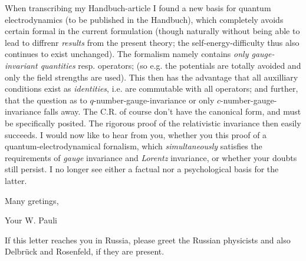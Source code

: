 \documentclass{article}
\begin{document}
When transcribing my Handbuch-article I found a new basis for quantum electrodynamics (to be published in the Handbuch), which completely avoids certain formal  in the current formulation (though naturally without being able to lead to diffrenr \textit{results} from the present theory; the self-energy-difficulty thus also continues to exist unchanged). The formalism namely contains \textit{only gauge-invariant quantities} resp. operators; (so e.g. the potentials are totally avoided and only the field strengths are used). This then has the advantage that all auxilliary conditions exist as \textit{identities}, i.e. are commutable with all operators; and further, that the question as to $q$-number-gauge-invariance or only $c$-number-gauge-invariance falls away. The C.R. of course don't have the canonical form, and must be specifically posited. The rigorous proof of the relativistic invariance then easily succeeds. I would now like to hear from you, whether you  this proof of a quantum-electrodynamical fornalism, which \textit{simultaneously} satisfies the requirements of \textit{gauge} invariance and \textit{Lorentz} invariance, or whether your doubts still persist. I no longer see either a factual nor a psychological basis for the latter.

Many gretings,

Your W. Pauli

If this letter reaches you in Russia, please greet the Russian physicists and also Delbr\"uck and Rosenfeld, if they are present.
\end{document}
